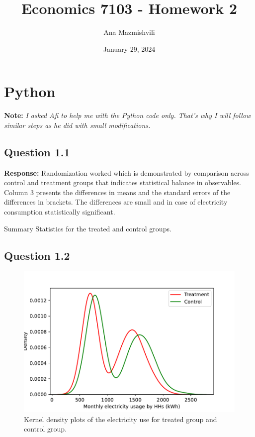 \documentclass{article}
\title{Economics 7103 - Homework 2}
\author{Ana Mazmishvili}
\date{ January 29, 2024 }
\begin{document}
  
\maketitle 

\section*{Python}
\textbf{Note:} \textit{I asked Afi to help me with the Python code only. That's why I will follow similar steps as he did with small modifications. }

\subsection*{Question 1.1}
\textbf{Response:} Randomization worked which is demonstrated by comparison across control and treatment groups that indicates statistical balance in observables. Column 3 presents the differences in means and the standard errors of the differences in brackets. The differences are small and in case of electricity consumption statistically significant.

\begin{table}[ht]
    \centering
    
    \caption{Summary Statistics for the treated and control groups.}
    \label{tab:my_label}
\end{table}


\subsection*{Question 1.2}

\begin{figure}[ht]
    \centering
    \includegraphics[scale = 0.7]{homework 2/output/figure/densityplotpy.pdf}
    \caption{Kernel density plots of the electricity use for treated group and control group.}
    \label{fig:hist}
\end{figure}
\end{document}
